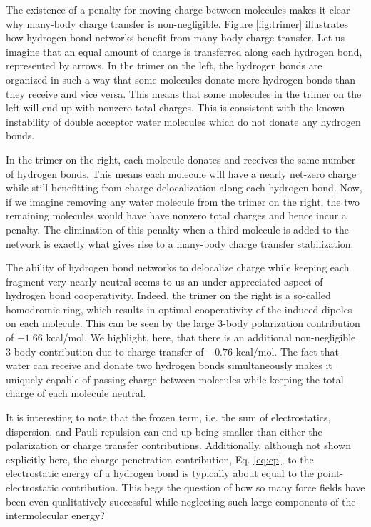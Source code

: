 \documentclass[journal=jacsat,manuscript=article]{achemso}
\begin{document}
The existence of a penalty for moving charge between molecules makes it clear
why many-body charge transfer is non-negligible. Figure \ref{fig:trimer} illustrates
how hydrogen bond networks benefit from many-body charge transfer. Let us imagine that
an equal amount of charge is transferred along each hydrogen bond, represented by arrows. 
In the trimer on the left, the hydrogen bonds are organized in such a way that some molecules
donate more hydrogen bonds than they receive and vice versa. This means that some molecules
in the trimer on the left will end up with nonzero total charges. This is consistent
with the known instability of double acceptor water molecules which do not donate
any hydrogen bonds.\cite{kirov2008identifying}

In the trimer on the right, each molecule donates and receives the same number of hydrogen bonds.
This means each molecule will have a nearly net-zero charge while still
benefitting from charge delocalization along each hydrogen bond. Now, if we imagine
removing any water molecule from the trimer on the right, the two remaining molecules would have
have nonzero total charges and hence incur a penalty. The elimination of this penalty
when a third molecule is added to the network is exactly what gives rise to a many-body charge transfer stabilization.

The ability of hydrogen bond networks
to delocalize charge while keeping each fragment very nearly neutral seems to us
an under-appreciated aspect of hydrogen bond cooperativity. Indeed, the trimer on the right
is a so-called homodromic ring, which results in optimal cooperativity
of the induced dipoles on each molecule.\cite{xantheas2000cooperativity} This can be
seen by the large 3-body polarization contribution of $-1.66$ kcal/mol. We highlight, here,
that there is an additional non-negligible 3-body contribution due to charge transfer of
$-0.76$ kcal/mol. The fact that water can receive and donate two hydrogen bonds simultaneously
makes it uniquely capable of passing charge between molecules while keeping the total charge
of each molecule neutral.

It is interesting to note that the frozen term, i.e. the sum of electrostatics, dispersion, and
Pauli repulsion can end up being smaller than either the polarization or charge transfer contributions.
Additionally, although not shown explicitly here, the charge penetration contribution, Eq. \ref{eq:cp}, to the
electrostatic energy of a hydrogen bond is typically about equal to the point-electrostatic contribution.
This begs the question of how so many force fields have been even qualitatively successful while
neglecting such large components of the intermolecular energy?
\end{document}

